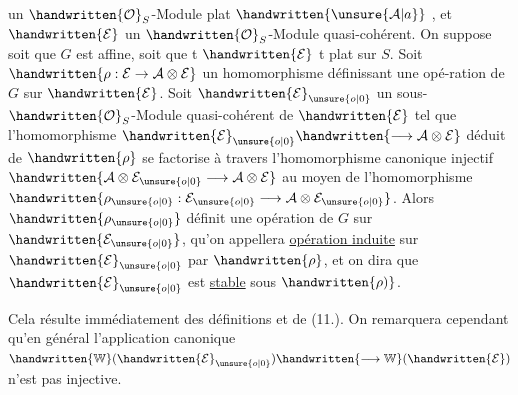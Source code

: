 un $\handwritten{\mathcal{O}}_S$-Module plat $\handwritten{\unsure{\mathcal{A}|a}}$ , et $\handwritten{\mathcal{E}}$ un $\handwritten{\mathcal{O}}_S$-Module quasi-cohérent. On suppose soit que $G$ est affine, soit que t $\handwritten{\mathcal{E}}$ t plat sur $S$. Soit $\handwritten{\rho:\mathcal{E}\to\mathcal{A}\otimes\mathcal{E}}$ un homomorphisme définissant une opé-\linebreak ration de $G$ sur $\handwritten{\mathcal{E}}$. Soit $\handwritten{\mathcal{E}}_{\unsure{o|0}}$ un sous-$\handwritten{\mathcal{O}}_S$-Module quasi-cohérent de $\handwritten{\mathcal{E}}$ tel que l'homomorphisme $\handwritten{\mathcal{E}}_{\unsure{o|0}}\handwritten{\longrightarrow\mathcal{A}\otimes\mathcal{E}}$ déduit de $\handwritten{\rho}$ se factorise à travers l'homomorphisme canonique \handwritten{(}injectif $\handwritten{\mathcal{A}\otimes\mathcal{E}_{\unsure{o|0}}\longrightarrow\mathcal{A}\otimes\mathcal{E}}$ au moyen de l'homomorphisme $\handwritten{\rho_{\unsure{o|0}}:\mathcal{E}_{\unsure{o|0}}\longrightarrow\mathcal{A}\otimes\mathcal{E}_{\unsure{o|0}}}$. Alors $\handwritten{\rho_{\unsure{o|0}}}$ définit une opération de $G$ sur $\handwritten{\mathcal{E}_{\unsure{o|0}}}$\handwritten{(},\handwritten{(} qu'on appellera \uline{opération induite} sur $\handwritten{\mathcal{E}}_{\unsure{o|0}}$ par $\handwritten{\rho}$, et on dira que $\handwritten{\mathcal{E}}_{\unsure{o|0}}$ est \uline{stable} sous $\handwritten{\rho)}$.

Cela résulte immédiatement des définitions et de (11.). On remarquera cependant qu'en général l'application canonique $\handwritten{\mathbb{W}}(\handwritten{\mathcal{E}}_{\unsure{o|0}})\handwritten{\longrightarrow\mathbb{W}}(\handwritten{\mathcal{E}})$ n'est pas injective.

